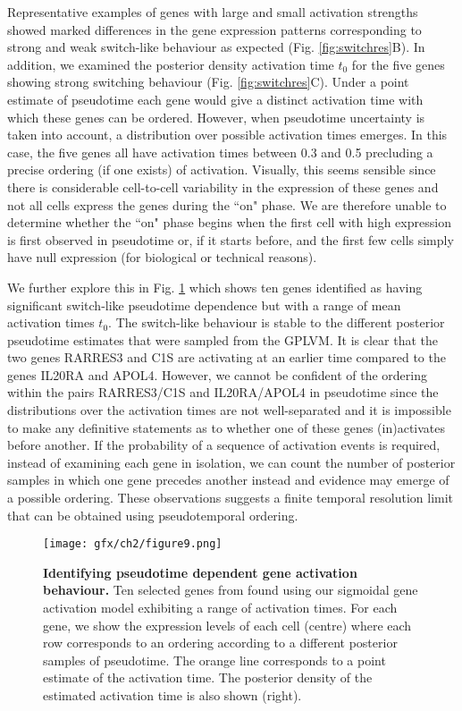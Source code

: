Representative examples of genes with large and small activation strengths showed marked differences in the gene expression patterns corresponding  to strong and weak switch-like behaviour as expected (Fig. \ref{fig:switchres}B). In addition, we examined the posterior density activation time $t_0$ for the five genes showing strong switching behaviour (Fig. \ref{fig:switchres}C). Under a point estimate of pseudotime each gene would give a distinct activation time with which these genes can be ordered. However, when pseudotime uncertainty is taken into account, a distribution over possible activation times emerges. In this case, the five genes all have activation times between 0.3 and 0.5 precluding a precise ordering (if one exists) of activation. Visually, this seems sensible since there is considerable cell-to-cell variability in the expression of these genes and not all cells express the genes during the ``on" phase. We are therefore unable to determine whether the ``on" phase begins when the first cell with high expression is first observed in pseudotime or, if it starts before, and the first few cells simply have null expression (for biological or technical reasons).

We further explore this in Fig. \ref{fig:switchres2} which shows ten genes identified as having significant switch-like pseudotime dependence but with a range of mean activation times $t_0$. The switch-like behaviour is stable to the different posterior pseudotime estimates that were sampled from the GPLVM. It is clear that the two genes RARRES3 and C1S are activating at an earlier time compared to the genes IL20RA and APOL4. However, we cannot be confident of the ordering within the pairs RARRES3/C1S and IL20RA/APOL4 in pseudotime since the distributions over the activation times are not well-separated and it is impossible to make any definitive statements as to whether one of these genes (in)activates before another. If the probability of a sequence of activation events is required, instead of examining each gene in isolation, we can count the number of posterior samples in which one gene precedes another instead and evidence may emerge of a possible ordering. These observations suggests a finite temporal resolution limit that can be obtained using pseudotemporal ordering.

\begin{figure}%
\centering
	\texttt{[image: gfx/ch2/figure9.png]}
\caption{ {\bf Identifying pseudotime dependent gene activation behaviour.} Ten selected genes from \cite{Trapnell2014} found using our  sigmoidal gene activation model exhibiting a range of activation times. For each gene, we show the expression levels of each cell (centre) where each row corresponds to an ordering according to a different posterior samples of pseudotime. The orange line corresponds to a point estimate of the activation time. The posterior density of the estimated activation time is also shown (right).
} \label{fig:switchres2}
\end{figure}

